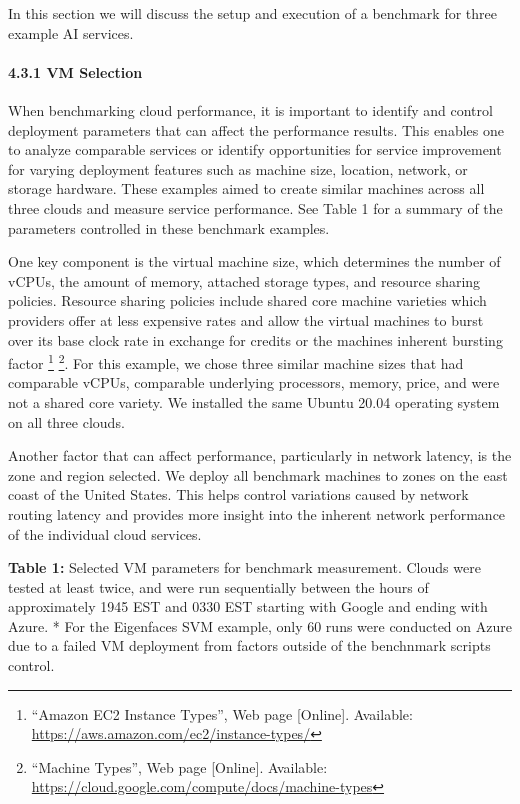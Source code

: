In this section we will discuss the setup and execution of a benchmark
for three example AI services.

\hypertarget{vm-selection}{%
\paragraph{4.3.1 VM Selection}\label{vm-selection}}

When benchmarking cloud performance, it is important to identify and
control deployment parameters that can affect the performance results.
This enables one to analyze comparable services or identify
opportunities for service improvement for varying deployment features
such as machine size, location, network, or storage hardware. These
examples aimed to create similar machines across all three clouds and
measure service performance. See Table 1 for a summary of the parameters
controlled in these benchmark examples.

One key component is the virtual machine size, which determines the
number of vCPUs, the amount of memory, attached storage types, and
resource sharing policies. Resource sharing policies include shared core
machine varieties which providers offer at less expensive rates and
allow the virtual machines to burst over its base clock rate in exchange
for credits or the machines inherent bursting factor \footnote{``Amazon
  EC2 Instance Types'', Web page {[}Online{]}. Available:
  \url{https://aws.amazon.com/ec2/instance-types/}} \footnote{``Machine
  Types'', Web page {[}Online{]}. Available:
  \url{https://cloud.google.com/compute/docs/machine-types}}. For this
example, we chose three similar machine sizes that had comparable vCPUs,
comparable underlying processors, memory, price, and were not a shared
core variety. We installed the same Ubuntu 20.04 operating system on all
three clouds.

Another factor that can affect performance, particularly in network
latency, is the zone and region selected. We deploy all benchmark
machines to zones on the east coast of the United States. This helps
control variations caused by network routing latency and provides more
insight into the inherent network performance of the individual cloud
services.

\textbf{Table 1:} Selected VM parameters for benchmark measurement.
Clouds were tested at least twice, and were run sequentially between the
hours of approximately 1945 EST and 0330 EST starting with Google and
ending with Azure. * For the Eigenfaces SVM example, only 60 runs were
conducted on Azure due to a failed VM deployment from factors outside of
the benchnmark scripts control.

